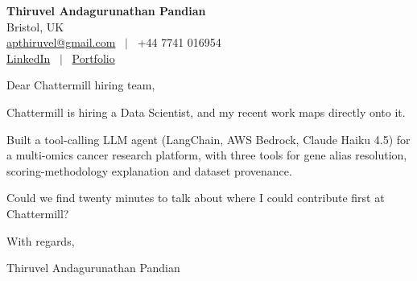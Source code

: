 \documentclass[11pt,a4paper]{article}
\begin{document}
\raggedright
\pagestyle{empty}

\begin{center}
    {\LARGE \color{linkblue} \textbf{Thiruvel Andagurunathan Pandian}}\\[0.2cm]
    Bristol, UK \\
    \href{mailto:apthiruvel@gmail.com}{apthiruvel@gmail.com} \ $|$ \ +44 7741 016954 \\
\href{https://www.linkedin.com/in/thiruvel-a-p/}{LinkedIn} \ $|$ \ \href{https://thiruvel-ap.github.io/PersonalPortfolio/}{Portfolio}
\end{center}

\vspace{0.4cm}

\noindent
Dear Chattermill hiring team,

Chattermill is hiring a Data Scientist, and my recent work maps directly onto it.

Built a tool-calling LLM agent (LangChain, AWS Bedrock, Claude Haiku 4.5) for a multi-omics cancer research platform, with three tools for gene alias resolution, scoring-methodology explanation and dataset provenance.

Could we find twenty minutes to talk about where I could contribute first at Chattermill?

\vspace{0.5cm}

With regards,

Thiruvel Andagurunathan Pandian
\end{document}
